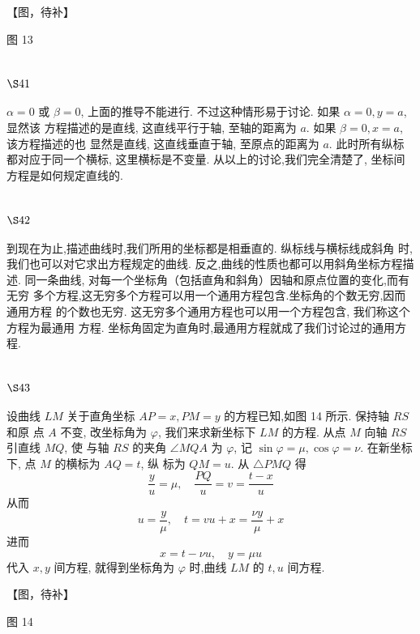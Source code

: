 【图，待补】

图 13 

\section{$\S 41$}

$\alpha=0$ 或 $\beta=0$, 上面的推导不能进行. 不过这种情形易于讨论. 如果 $\alpha=0, y=a$, 显然该 方程描述的是直线, 这直线平行于轴, 至轴的距离为 $a$. 如果 $\beta=0, x=a$, 该方程描述的也 显然是直线, 这直线垂直于轴, 至原点的距离为 $a$. 此时所有纵标都对应于同一个横标, 这里横标是不变量. 从以上的讨论,我们完全清楚了, 坐标间方程是如何规定直线的.

\section{$\S 42$}

到现在为止,描述曲线时,我们所用的坐标都是相垂直的. 纵标线与横标线成斜角 时,我们也可以对它求出方程规定的曲线. 反之,曲线的性质也都可以用斜角坐标方程描 述. 同一条曲线, 对每一个坐标角（包括直角和斜角）因轴和原点位置的变化,而有无穷 多个方程,这无穷多个方程可以用一个通用方程包含.坐标角的个数无穷,因而通用方程 的个数也无穷. 这无穷多个通用方程也可以用一个方程包含, 我们称这个方程为最通用 方程. 坐标角固定为直角时,最通用方程就成了我们讨论过的通用方程.

\section{$\S 43$}

设曲线 $L M$ 关于直角坐标 $A P=x, P M=y$ 的方程已知,如图 14 所示. 保持轴 $R S$ 和原 点 $A$ 不变, 改坐标角为 $\varphi$, 我们来求新坐标下 $L M$ 的方程. 从点 $M$ 向轴 $R S$ 引直线 $M Q$, 使 与轴 $R S$ 的夹角 $\angle M Q A$ 为 $\varphi$, 记 $\sin \varphi=\mu, \cos \varphi=\nu$. 在新坐标下, 点 $M$ 的横标为 $A Q=t$, 纵 标为 $Q M=u$. 从 $\triangle P M Q$ 得
\[
\frac{y}{u}=\mu, \quad \frac{P Q}{u}=v=\frac{t-x}{u}
\]
从而
\[
u=\frac{y}{\mu}, \quad t=v u+x=\frac{\nu y}{\mu}+x
\]
进而
\[
x=t-\nu u, \quad y=\mu u
\]
代入 $x, y$ 间方程, 就得到坐标角为 $\varphi$ 时,曲线 $L M$ 的 $t, u$ 间方程.


【图，待补】

图 14 

